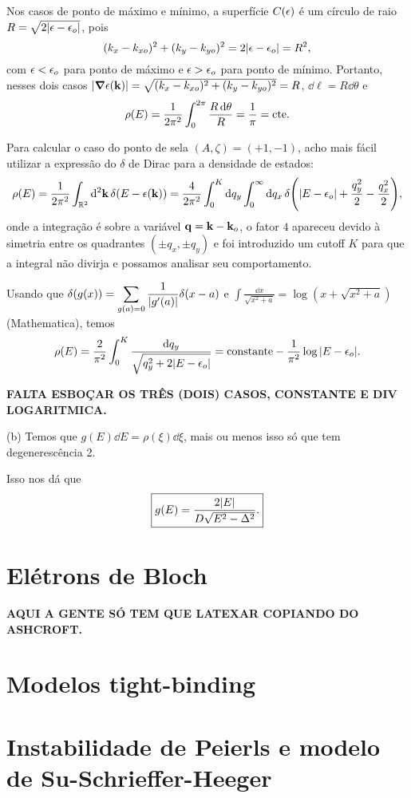 \documentclass[a4paper,10pt]{article}
\begin{document}
Nos casos de ponto de máximo e mínimo, a superfície $C(\epsilon)$ é um círculo de raio $R = \sqrt{2\abs{\epsilon-\epsilon_o}}$, pois
$$
(k_x - k_{xo})^2 + (k_y - k_{yo})^2 = 2 \abs{\epsilon - \epsilon_o} = R^2,
$$
com $\epsilon < \epsilon_o$ para ponto de máximo e $\epsilon > \epsilon_o$ para ponto de mínimo. Portanto, nesses dois casos $\abs{\grad{\epsilon(\vb{k})}} = \sqrt{(k_x - k_{xo})^2 + (k_y - k_{yo})^2} = R$, $\dd{\ell} = R \dd{\theta}$ e
$$
\rho(E) = \frac{1}{2\pi^2} \int_0^{2\pi} \frac{R \dd{\theta}}{R} = \frac{1}{\pi} = \text{cte}.
$$

Para calcular o caso do ponto de sela $(A, \zeta) = (+1, -1)$, acho mais fácil utilizar a expressão do $\delta$ de Dirac para a densidade de estados:
$$
\rho(E) = \frac{1}{2\pi^2} \int_{\mathbb{R}^2} \dd[2]{\vb{k}} \delta(E - \epsilon(\vb{k})) =
\frac{4}{2 \pi^2} \int_0^K \dd{q_y} \int_0^\infty \dd{q_x}
\delta\qty(\abs{E - \epsilon_o} + \frac{q_y^2}{2} - \frac{q_x^2}{2}),
$$
onde a integração é sobre a variável $\vb{q} = \vb{k} - \vb{k}_o$, o fator $4$ apareceu devido à simetria entre os quadrantes $(\pm q_x, \pm q_y)$ e foi introduzido um cutoff $K$ para que a integral não divirja e possamos analisar seu comportamento.

Usando que $\displaystyle{\delta(g(x)) = \sum_{g(a)=0} \frac{1}{\abs{g'(a)}} \delta(x-a)}$ e $\displaystyle{\int \frac{\dd{x}}{\sqrt{x^2+a}} = \log(x + \sqrt{x^2 + a})}$ (Mathematica), temos
$$
\rho(E) = \frac{2}{\pi^2} \int_0^K \frac{\dd{q_y}}{\sqrt{q_y^2 + 2 \abs{E-\epsilon_o}}} =
\text{constante} - \frac{1}{\pi^2} \log\abs{E-\epsilon_o}.
$$

\textbf{FALTA ESBOÇAR OS TRÊS (DOIS) CASOS, CONSTANTE E DIV LOGARITMICA.}

\n

(b) Temos que $g(E) \dd{E} = \rho(\xi) \dd{\xi}$, mais ou menos isso só que tem degenerescência 2.

Isso nos dá que
$$
\boxed{ g(E) = \frac{2 \abs{E}}{D \sqrt{E^2 - \Delta^2}}. }
$$



\pagebreak

\section{Elétrons de Bloch}

\textbf{AQUI A GENTE SÓ TEM QUE LATEXAR COPIANDO DO ASHCROFT.}

\pagebreak

\section{Modelos tight-binding}

\pagebreak

\section{Instabilidade de Peierls e modelo de Su-Schrieffer-Heeger}
\end{document}

